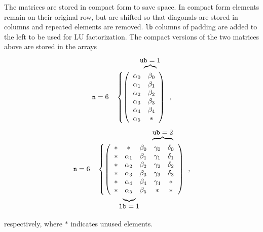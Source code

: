 \documentclass[10pt]{article}
\begin{document}
The matrices are stored in compact form to save space. In compact form elements
remain on their original row, but are shifted so that diagonals are stored in
columns and repeated elements are removed.  \texttt{lb} columns of padding are
added to the left to be used for LU factorization.  The compact versions of the
two matrices above are stored in the arrays
\begin{alignat}{2}
  \nonumber
  &&&\hspace{3.4em}\mbox{\raisebox{-1em}{$\overbrace{\quad}^{\displaystyle\texttt{ub}=1}$}} \\
  &\texttt{n}=6  &
  &\left\{\left(
  \begin{array}{cc}
    \alpha_0 & \beta_0 \\
    \alpha_1 & \beta_1 \\
    \alpha_2 & \beta_2 \\
    \alpha_3 & \beta_3 \\
    \alpha_4 & \beta_4 \\
    \alpha_5 & * \\
  \end{array}
  \right)\right.
  ~,
\end{alignat}
\begin{alignat}{2}
  \nonumber
  &&&\hspace{7.8em}\mbox{\raisebox{-1em}{$\overbrace{\hspace{3em}}^{\displaystyle\texttt{ub}=2}$}} \\
  &\texttt{n}=6  &
  &\left\{\left(
  \begin{array}{ccccc}
  *  &        *  & \beta_0 & \gamma_0 & \delta_0 \\
  *  & \alpha_1 & \beta_1 & \gamma_1 & \delta_1 \\
  *  & \alpha_2 & \beta_2 & \gamma_2 & \delta_2 \\
  *  & \alpha_3 & \beta_3 & \gamma_3 & \delta_3 \\
  *  & \alpha_4 & \beta_4 & \gamma_4 & * \\
  *  & \alpha_5 & \beta_5 & *        & * \\
  \end{array}
  \right)\right.
  ~,\\
  \nonumber
  &&&\hspace{3.1em}\mbox{\raisebox{2em}{$\underbrace{\hspace{1em}}_{\displaystyle\texttt{lb}=1}$}}
\end{alignat}
respectively, where $*$ indicates unused elements.
\end{document}
